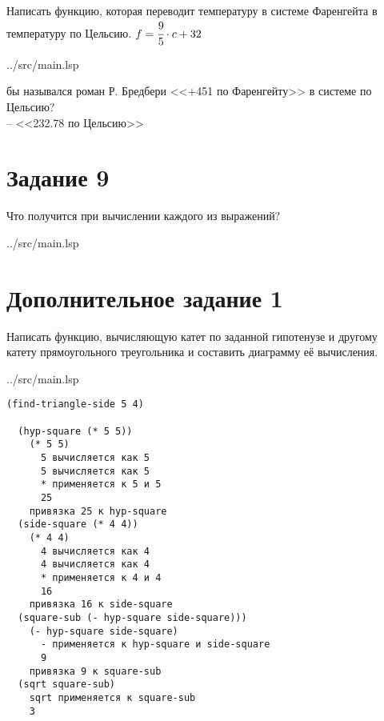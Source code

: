 Написать функцию, которая переводит температуру в системе Фаренгейта в температуру по Цельсию. $f = \cfrac{9}{5}\cdot c + 32$

\begin{lstinputlisting}[
	caption={Задание 8},
	label={lst:t8},
	style={lsp},
	linerange={59-61},
	]{../src/main.lsp}
\end{lstinputlisting}

 бы назывался роман Р. Бредбери <<+451 по Фаренгейту>> в системе по Цельсию?\\
-- <<232.78 по Цельсию>>

\section*{Задание 9}

Что получится при вычислении каждого из выражений?

\begin{lstinputlisting}[
	caption={Задание 9},
	label={lst:t9},
	style={lsp},
	linerange={65-71},
	]{../src/main.lsp}
\end{lstinputlisting}

\section*{Дополнительное задание 1}

Написать функцию, вычисляющую катет по заданной гипотенузе и другому катету прямоугольного треугольника и составить диаграмму её вычисления. 

\begin{lstinputlisting}[
	caption={Дополнительное задание 1},
	label={lst:e1},
	style={lsp},
	linerange={74-79},
	]{../src/main.lsp}
\end{lstinputlisting}

\clearpage
\begin{lstlisting}[style={scheme}]
(find-triangle-side 5 4)
	
  (hyp-square (* 5 5))
    (* 5 5)
      5 вычисляется как 5
      5 вычисляется как 5
      * применяется к 5 и 5
      25
    привязка 25 к hyp-square
  (side-square (* 4 4))
    (* 4 4)
      4 вычисляется как 4
      4 вычисляется как 4
      * применяется к 4 и 4
      16
    привязка 16 к side-square
  (square-sub (- hyp-square side-square)))
    (- hyp-square side-square)
      - применяется к hyp-square и side-square
      9
    привязка 9 к square-sub
  (sqrt square-sub)
    sqrt применяется к square-sub
    3
\end{lstlisting}

